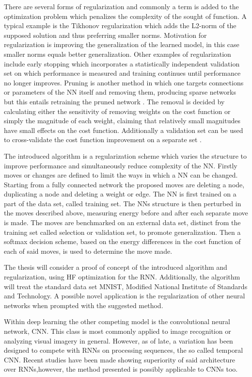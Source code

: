 There are several forms of regularization and commonly a term is added to the optimization problem which penalizes the complexity of the sought of function. A typical example is the Tikhonov regularization which adds the L2-norm of the supposed solution and thus preferring smaller norms. Motivation for regularization is improving the generalization of the learned model, in this case smaller norms equals better generalization. Other examples of regularization include early stopping which incorporates a statistically independent validation set on which performance is measured and training continues until performance no longer improves. Pruning is another method in which one targets connections or parameters of the NN itself and removing them, producing sparse networks but this entails retraining the pruned network \cite{Yann}. The removal is decided by calculating either the sensitivity of removing weights on the cost function or simply the magnitude of each weight, claiming that relatively small magnitudes have small effects on the cost function. Additionally a validation set can be used to cross-validate the cost function improvement on a separate set \cite{prunings}. 

The introduced algorithm is a regularization scheme which varies the structure to improve performance and simultaneously reduce complexity of the NN. Firstly moves or changes are defined to limit the ways in which a NN can be changed. Starting from a fully connected network the proposed moves are deleting a node, duplicating a node and deleting a weight or edge. The NN is first trained on a part of the data set, called training set. The NNs structure is then perturbed in the moves described above, measuring energy before and after each separate move is made. The moves are benchmarked on an external data set, distinct from the training set called selection or validation set, to promote generalization. Then a softmax decision scheme, based on the energy differences in the cost function of each of said moves, is used to determine the move made. 

The thesis will consider a proof of concept of the introduced algorithm and regularization, using HF optimization for the RNN. Additionally, the algorithm will treat the standard data set MNIST, Modified National Institute of Standards and Technology\cite{mnist}. A possible novel application is the regularization of other neural networks when prompted with the suggested method.

Within deep learning the other competing model is the convolutional neural network, CNN. This class is most commonly applied to image recognition or analyzing visual imagery in general. However, as of late, a variation has been designed to compete with RNNs on processing sequences, the so called temporal CNN. Recent studies have been made showing superiority of said architecture over RNNs\cite{tcnvsrnn},however, the method presented is possibly applicable to CNNs too.

